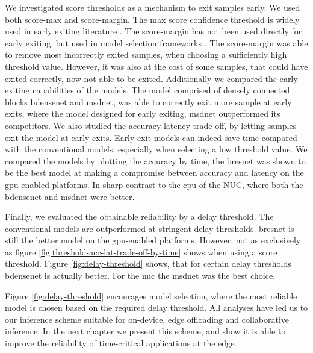 We investigated score thresholds as a mechanism to exit samples early. We used both score-max and score-margin. The max score confidence threshold is widely used in early exiting literature \cite{leroux_resource-constrained_2015, leroux_cascading_2017, kaya_shallow-deep_nodate, berestizshevsky_sacrificing_2019}. The score-margin has not been used directly for early exiting, but used in model selection frameworks \cite{park_big/little_2015,tann_flexible_2018}. The score-margin was able to remove most incorrectly exited samples, when choosing a sufficiently high threshold value. However, it was also at the cost of some samples, that could have exited correctly, now not able to be exited. Additionally we compared the early exiting capabilities of the models. The model comprised of densely connected blocks \gls{bdensenet} and \gls{msdnet}, was able to correctly exit more sample at early exits, where the model designed for early exiting, \gls{msdnet} outperformed its competitors. We also studied the accuracy-latency trade-off, by letting samples exit the model at early exits. Early exit models can indeed save time compared with the conventional models, especially when selecting a low threshold value. We compared the models by plotting the accuracy by time, the \gls{bresnet} was shown to be the best model at making a compromise between accuracy and latency on the \gls{gpu}-enabled platforms. In sharp contrast to the \gls{cpu} of the NUC, where both the \gls{bdensenet} and \gls{msdnet} were better.

Finally, we evaluated the obtainable reliability by a delay threshold. The conventional models are outperformed at stringent delay thresholds. \gls{bresnet} is still the better model on the \gls{gpu}-enabled platforms. However, not as exclusively as figure \ref{fig:threshold-acc-lat-trade-off-by-time} shows when using a score threshold. Figure \ref{fig:delay-threshold} shows, that for certain delay thresholds \gls{bdensenet} is actually better. For the \gls{nuc} the \gls{msdnet} was the best choice.

Figure \ref{fig:delay-threshold} encourages model selection, where the most reliable model is chosen based on the required delay threshold. All analyses have led us to our inference scheme suitable for on-device, edge offloading and collaborative inference. In the next chapter we present this scheme, and show it is able to improve the reliability of time-critical applications at the edge.